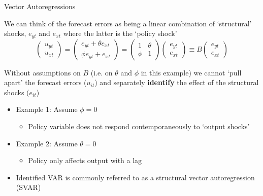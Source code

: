\begin{frame}{Vector Autoregressions}

We can think of the forecast errors as being a linear combination of `structural' shocks, $e_{yt}$ and $e_{xt}$ where the latter is the `policy shock'
\begin{equation*}
\begin{pmatrix}
u_{yt} \\
u_{xt}
\end{pmatrix}
=
\begin{pmatrix}
e_{yt}+\theta e_{xt} \\
\phi e_{yt} + e_{xt}
\end{pmatrix}
=
\begin{pmatrix}
1 	& \theta \\
\phi & 1
\end{pmatrix}
\begin{pmatrix}
e_{yt} \\
e_{xt}
\end{pmatrix}
\equiv
B
\begin{pmatrix}
e_{yt} \\
e_{xt}
\end{pmatrix}
\end{equation*}

\vspace{2mm}
Without assumptions on $B$ (i.e. on $\theta$ and $\phi$ in this example) we cannot `pull apart' the forecast errors ($u_{it}$) and separately \textbf{identify} the effect of the structural shocks ($e_{it}$)
\begin{itemize}
\item	Example 1: Assume $\phi=0$
	\begin{itemize}
	\item	Policy variable does not respond contemporaneously to `output shocks'
	\end{itemize}
\item	Example 2: Assume $\theta=0$
	\begin{itemize}
	\item	Policy only affects output with a lag
	\end{itemize}
\item	Identified VAR is commonly referred to as a structural vector autoregression (SVAR)
\end{itemize}

\end{frame}
	

